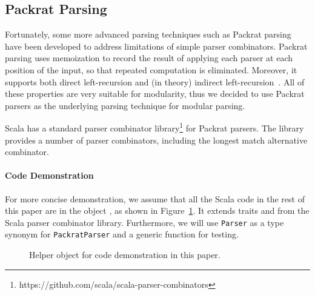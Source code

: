 \subsection{Packrat Parsing}\label{subsec:packratparsing}
Fortunately, some more advanced parsing techniques such as Packrat
parsing~\cite{Ford2002} have been developed to address limitations of
simple parser combinators. Packrat parsing uses memoization to record
the result of applying each parser at each position of the input, so
that repeated computation is eliminated. Moreover, it supports both direct left-recursion
and (in theory) indirect left-recursion~\cite{warth2008}.
All of these properties are very suitable for modularity, thus we decided to use Packrat parsers as the underlying parsing technique for modular parsing.
\begin{comment}
It is worth mentioning that the choice of parser combinators will not
affect the other parts of our library. One can choose other parser
combinators like Parsec, in cases that the performance and supporting
of left-recursion are not major concerns. A different library can even build a new
\name with fancy features or higher efficiency.
\end{comment}
Scala has a standard parser combinator library\footnote{https://github.com/scala/scala-parser-combinators}
\cite{moors2008parser} for Packrat parsers.
The library provides a number of parser combinators, including the longest match alternative combinator.

\paragraph{Code Demonstration}
For more concise demonstration, we assume that all the Scala code in the rest of this paper are in the object , as shown in Figure~\ref{fig:papercode}. It extends traits  and  from the Scala parser combinator library. Furthermore, we will use \lstinline{Parser} as a type synonym for \lstinline{PackratParser} and a generic  function for testing.

\begin{figure}[t]
\centering
\caption{Helper object for code demonstration in this paper.}\label{fig:papercode}
\end{figure}

